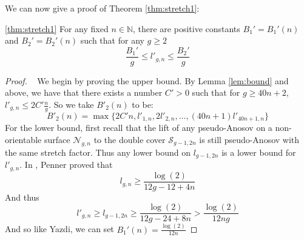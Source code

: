 We can now give a proof of Theorem \ref{thm:stretch1}:

\begin{manualtheorem}{\ref{thm:stretch1}}
For any fixed $n \in \mathbb{N}$, there are positive constants $B_1' = B_1'(n)$ and $B_2' = B_2'(n)$ such that for any $g \geq 2$
$$\frac{B_1'}{g} \leq l'_{g,n} \leq \frac{B_2'}{g}$$
\end{manualtheorem}
\begin{proof}
    ~
    We begin by proving the upper bound. By Lemma \ref{lem:bound} and above, we have that there exists a number $C' > 0$ such that for $g \geq 40n + 2$, $l'_{g,n} \leq 2C'\frac{n}{g}$. So we take $B'_2(n)$ to be:
    $$B'_2(n) = \max\{2C'n, l'_{1,n}, 2l'_{2,n}, \dots, (40n + 1)l'_{40n+1,n}\}$$
    For the lower bound, first recall that the lift of any pseudo-Anosov on a non-orientable surface $\mathcal{N}_{g,n}$ to the double cover $\mathcal{S}_{g-1,2n}$ is still pseudo-Anosov with the same stretch factor. Thus any lower bound on $l_{g-1,2n}$ is a lower bound for $l'_{g,n}$. In \cite{penner1991bounds}, Penner proved that
    $$l_{g,n} \geq \frac{\log(2)}{12g - 12 + 4n}$$
    And thus $$l'_{g,n} \geq l_{g-1,2n} \geq \frac{\log(2)}{12g - 24 + 8n} > \frac{\log(2)}{12ng}$$
    And so like Yazdi, we can set $B_1'(n) = \frac{\log(2)}{12n}$
\end{proof}
